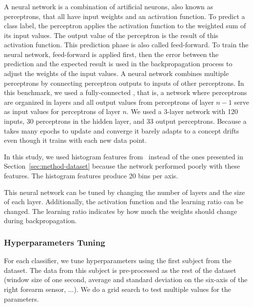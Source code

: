 \subsubsection{\FNN}
\label{sec:method-fnn}
A neural network is a combination of artificial
neurons, also known as perceptrons, that all have input weights and an
activation function. To predict a class label, the
perceptron applies the activation function to the weighted sum
of its input values. The output
value of the perceptron is the result of this
activation function. This prediction phase is also
called feed-forward. To train the neural network,
feed-forward is applied first, then the error between the
prediction and the expected result is used in the
backpropagation process to adjust the weights of
the input values.  A neural network combines
multiple perceptrons by connecting perceptron outputs
to inputs of other perceptrons.  In
this benchmark, we used a fully-connected \FNN, 
that is, a network where perceptrons are organized in
layers and all output
values from perceptrons of layer $n-1$ serve as
input values for perceptrons of layer $n$. 
We used a 3-layer network with 120 inputs, 30
perceptrons in the hidden layer, and 33 output
perceptrons.
Because a \FNN takes many epochs to update and
converge it barely adapts to a concept drifts even
though it trains with each new data point.

In this study, we used histogram features
from~\cite{omid_2019} instead of the ones
presented in Section~\ref{sec:method-dataset}
because the network performed
poorly with these features. The histogram features
produce 20 bins per axis.

This neural network can be tuned by changing the
number of layers and the size of each layer.
Additionally, the activation function and the
learning ratio can be changed. The learning ratio
indicates by how much the weights should change
during backpropagation.

\subsubsection{Hyperparameters Tuning}
For each classifier, we tune hyperparameters  using the first subject from the
\banosdataset dataset.  The data from this subject is pre-processed as the rest
of the \banosdataset dataset (window size of one second, average and standard
deviation on the six-axis of the right forearm sensor, $\ldots$). We do a grid
search to test multiple values for the parameters.

